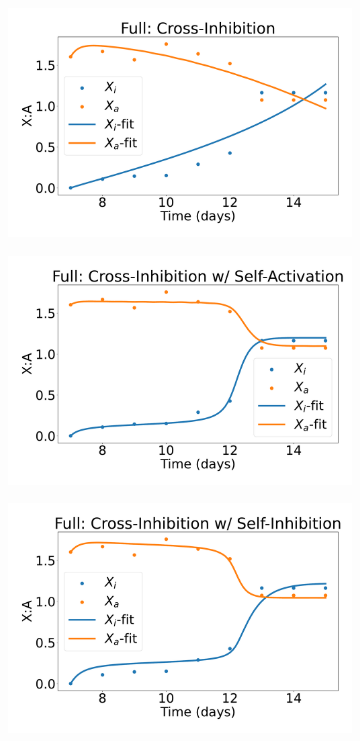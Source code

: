 \documentclass[11pt,a4paper]{article}
\begin{document}
\begin{figure}
    \centering
    \begin{subfigure}[c]{0.32\textwidth}
        \includegraphics[width=\textwidth]{IINN-iPSC_timeshifted-timeseries}
        \caption{}
        \label{IINN}
    \end{subfigure}
    \begin{subfigure}[c]{0.32\textwidth}
        \includegraphics[width=\textwidth]{IIAA-iPSC_timeshifted-timeseries}
        \caption{}
        \label{IIAA}
    \end{subfigure}
    \begin{subfigure}[c]{0.32\textwidth}
        \includegraphics[width=\textwidth]{IIII-iPSC_timeshifted-timeseries}

\end{subfigure}
\end{figure}
\end{document}
